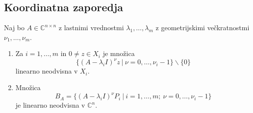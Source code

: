 \documentclass[mat1]{fmfdelo}
\newcommand{\C}{\mathbb C}
\begin{document}
\subsection{Koordinatna zaporedja}
\begin{lema}\label{lemaNeodvisnost}
    Naj bo $A \in \C^{n \times n}$ z lastnimi vrednostmi $\lambda_1, \ldots, \lambda_m$ z geometrijskimi večkratnostmi $\nu_1, \ldots, \nu_m$.
    \begin{enumerate}
        \item Za $i = 1, \ldots, m$ in $0\neq z \in X_i$ je množica
                 \begin{equation*}
                     \{(A-\lambda_i I)^{\nu} z\ |\ \nu = 0, \ldots, \nu_i - 1\} \backslash \{0\}
                 \end{equation*}
                linearno neodvisna v $X_i$.
        \item Množica
                 \begin{equation*}
                     B_A = \{(A-\lambda_i I)^{\nu} P_i\ |\ i = 1, \ldots, m;\ \nu = 0, \ldots, \nu_i - 1\}
                 \end{equation*}
                je linearno neodvisna v $\C^n$.
    \end{enumerate}
\end{lema}
\end{document}
